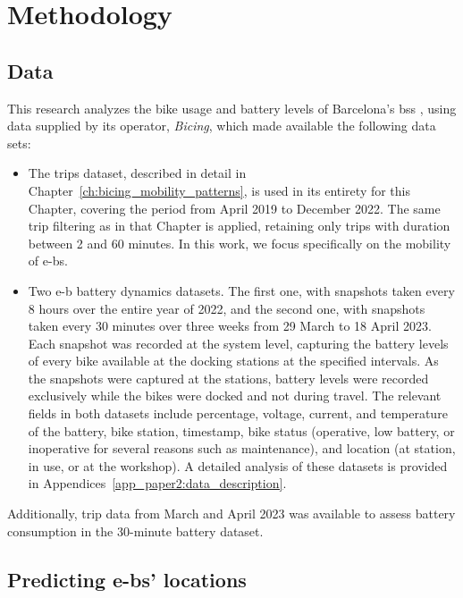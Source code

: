 \section{Methodology}
\label{sec:battery_methodology}

    \subsection{Data}

    This research analyzes the bike usage and battery levels of Barcelona's \ac{bss} \cite{Soriguera2018, Winslow2019, Grau-Escolano2024}, using data supplied by its operator, \textit{Bicing}, which made available the following data sets:

      \begin{itemize}
        \item The trips dataset, described in detail in Chapter~\ref{ch:bicing_mobility_patterns}, is used in its entirety for this Chapter, covering the period from April 2019 to December 2022. The same trip filtering as in that Chapter is applied, retaining only trips with duration between 2 and 60 minutes. In this work, we focus specifically on the mobility of \acp{e-b}.

        \item Two \ac{e-b} battery dynamics datasets. The first one, with snapshots taken every 8 hours over the entire year of 2022, and the second one, with snapshots taken every 30 minutes over three weeks from 29 March to 18 April 2023. Each snapshot was recorded at the system level, capturing the battery levels of every bike available at the docking stations at the specified intervals. As the snapshots were captured at the stations, battery levels were recorded exclusively while the bikes were docked and not during travel. The relevant fields in both datasets include percentage, voltage, current, and temperature of the battery, bike station, timestamp, bike status (operative, low battery, or inoperative for several reasons such as maintenance), and location (at station, in use, or at the workshop). A detailed analysis of these datasets is provided in Appendices~\ref{app_paper2:data_description}.
      \end{itemize}

    Additionally, trip data from March and April 2023 was available to assess battery consumption in the 30-minute battery dataset.



    \subsection[Predicting e-bikes' locations]{Predicting \acp{e-b}' locations}

